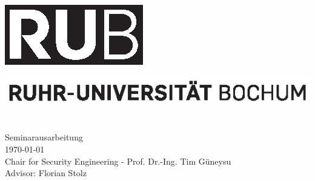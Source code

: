%
%

\frontmatter

\begin{titlepage}
 \enlargethispage{3cm}
 \vspace*{-32mm}\hspace*{120mm}
 \includegraphics[scale=1.0]{rub_logo.eps}
 
 \vspace*{11cm}\hspace*{0mm}
 \begin{minipage}[b]{1\linewidth}
  \sffamily
  \hspace{-17.2mm}\includegraphics[scale=1.0]{rub_slogan.eps}\\
  
  \nohyphens{
   {\bfseries \LARGE \sffamily {\thtitle}}
  }\\
  
  \large{
   \thauthor
  }\\
  
  \vspace*{35mm}
  \normalsize{
   Seminarausarbeitung\\
   \today\\
   Chair for Security Engineering - Prof. Dr.-Ing. Tim G{\"u}neysu\\
	 Advisor: Florian Stolz
  }
 \end{minipage}
\end{titlepage}


\newpage\thispagestyle{empty}
